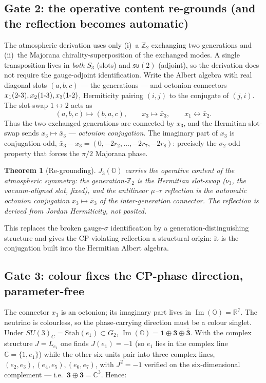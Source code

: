\documentclass[11pt]{article}
\newtheorem{theorem}{Theorem}
\theoremstyle{definition}
\newcommand{\OO}{\mathbb{O}}
\newcommand{\CC}{\mathbb{C}}
\newcommand{\RR}{\mathbb{R}}
\newcommand{\Imag}{\operatorname{Im}}
\newcommand{\JthreeO}{J_3(\OO)}
\newcommand{\su}{\mathfrak{su}}
\begin{document}
\subsection{Gate 2: the operative content re-grounds (and the reflection becomes automatic)}
The atmospheric derivation uses only (i)~a $\mathbb{Z}_2$ exchanging two generations and (ii)~the Majorana chirality-superposition of the exchanged modes. A single transposition lives in \emph{both} $S_3$ (slots) and $\su(2)$ (adjoint), so the derivation does not require the gauge-adjoint identification. Write the Albert algebra with real diagonal slots $(a,b,c)$ --- the generations --- and octonion connectors $x_1(2\text-3),x_2(1\text-3),x_3(1\text-2)$, Hermiticity pairing $(i,j)$ to the conjugate of $(j,i)$. The slot-swap $1\leftrightarrow2$ acts as
\begin{equation}
(a,b,c)\mapsto(b,a,c),\qquad x_3\mapsto \bar{x}_3,\qquad x_1\leftrightarrow\bar{x}_2 .
\end{equation}
Thus the two exchanged generations are connected by $x_3$, and the Hermitian slot-swap sends $x_3\mapsto\bar{x}_3$ --- \emph{octonion conjugation}. The imaginary part of $x_3$ is conjugation-odd, $\bar{x}_3-x_3=(0,-2r_2,\dots,-2r_7,-2r_8)$: precisely the $\sigma_2$-odd property that forces the $\pi/2$ Majorana phase.

\begin{theorem}[Re-grounding]
$\JthreeO$ carries the operative content of the atmospheric symmetry: the generation-$\mathbb{Z}_2$ is the Hermitian slot-swap ($\nu_3$, the vacuum-aligned slot, fixed), and the antilinear $\mu$--$\tau$ reflection is the automatic octonion conjugation $x_3\mapsto\bar{x}_3$ of the inter-generation connector. The reflection is \emph{derived from Jordan Hermiticity}, not posited.
\end{theorem}

\noindent This replaces the broken gauge-$\sigma$ identification by a generation-distinguishing structure and gives the CP-violating reflection a structural origin: it is the conjugation built into the Hermitian Albert algebra.

\subsection{Gate 3: colour fixes the CP-phase direction, parameter-free}\label{sec:gate3}
The connector $x_3$ is an octonion; its imaginary part lives in $\Imag(\OO)=\RR^7$. The neutrino is colourless, so the phase-carrying direction must be a colour singlet. Under $SU(3)_C=\mathrm{Stab}(e_1)\subset G_2$, $\Imag(\OO)=\mathbf 1\oplus\mathbf 3\oplus\bar{\mathbf 3}$. With the complex structure $J=L_{e_1}$ one finds $J(e_1)=-1$ (so $e_1$ lies in the complex line $\CC=\{1,e_1\}$) while the other six units pair into three complex lines, $(e_2,e_3),(e_4,e_5),(e_6,e_7)$, with $J^2=-1$ verified on the six-dimensional complement --- i.e.\ $\mathbf 3\oplus\bar{\mathbf 3}=\CC^3$. Hence:
\end{document}
